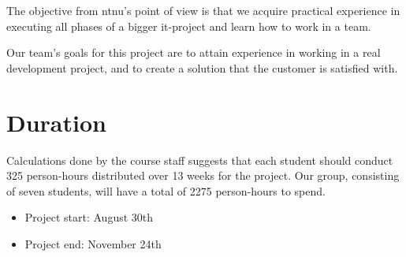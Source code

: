 The objective from \Gls{ntnu}'s point of view is that we acquire practical experience in executing all phases of a bigger \Gls{it}-project and learn
how to work in a team.

Our team's goals for this project are to attain experience in working in a real development project, and to create a solution that the customer
is satisfied with.

\section{Duration}
Calculations done by the course staff suggests that each student should conduct 325 person-hours distributed over 13 weeks for the project. Our group, consisting of seven students, will have a total of 2275 person-hours to spend.\\
\begin {itemize}
	\item Project start: August 30th
	\item Project end: November 24th
\end{itemize}

